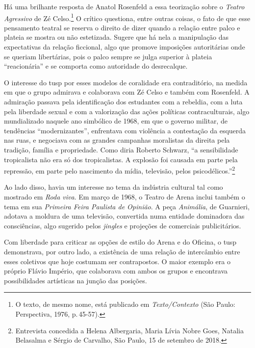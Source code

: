 Há uma brilhante resposta de Anatol Rosenfeld a essa teorização sobre o
{\it Teatro Agressivo} de Zé Celso.\footnote{O texto, de mesmo nome,
  está publicado em {\it Texto/Contexto} (São Paulo: Perspectiva, 1976,
  p.\,45-57).} O crítico questiona, entre outras coisas, o fato de que
esse pensamento teatral se reserva o direito de dizer quando a relação
entre palco e plateia se mostra ou não estetizada. Sugere que há nela a
manipulação das expectativas da relação ficcional, algo que promove
imposições autoritárias onde se queriam libertárias, pois o palco sempre
se julga superior à plateia “reacionária” e se comporta como autoridade
do desrecalque.

O interesse do {\sc tusp} por esses modelos de coralidade era contraditório,
na medida em que o grupo admirava e colaborava com Zé Celso e também com
Rosenfeld. A admiração passava pela identificação dos estudantes com a
rebeldia, com a luta pela liberdade sexual e com a valorização das ações
políticas contraculturais, algo mundializado naquele ano simbólico de
1968, em que o governo militar, de tendências “modernizantes”,
enfrentava com violência a contestação da esquerda nas ruas, e negociava
com as grandes campanhas moralistas da direita pela tradição, família e
propriedade. Como diria Roberto Schwarz, “a sensibilidade tropicalista
não era só dos tropicalistas. A explosão foi causada em parte pela
repressão, em parte pelo nascimento da mídia, televisão, pelos
psicodélicos.”\footnote{Entrevista concedida a Helena Albergaria, Maria
  Lívia Nobre Goes, Natalia Belasalma e Sérgio de Carvalho, São Paulo,
  15 de setembro de 2018.}

Ao lado disso, havia um interesse no tema da indústria cultural tal como
mostrado em {\it Roda viva}. Em março de 1968, o Teatro de Arena inclui
também o tema em sua {\it Primeira Feira Paulista de Opinião}. A peça
{\it Animália}, de Guarnieri, adotava a moldura de uma televisão,
convertida numa entidade dominadora das consciências, algo sugerido
pelos {\it jingles} e projeções de comerciais publicitários.

Com liberdade para criticar as opções de estilo do Arena e do Oficina, o
{\sc tusp} demonstrava, por outro lado, a existência de uma relação de
intercâmbio entre esses coletivos que hoje costumam ser contrapostos. O
maior exemplo era o próprio Flávio Império, que colaborava com ambos os
grupos e encontrava possibilidades artísticas na junção das posições.

